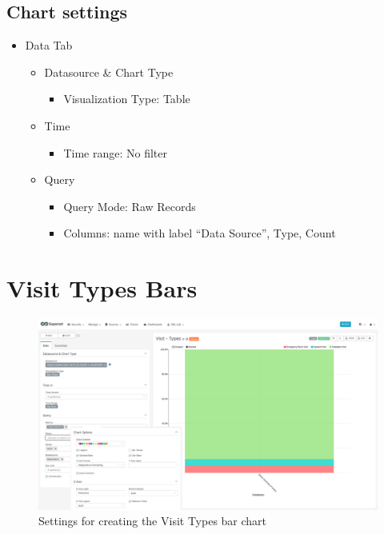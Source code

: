 \documentclass[
]{book}
\providecommand{\tightlist}{%
  \setlength{\itemsep}{0pt}\setlength{\parskip}{0pt}}
\begin{document}
\hypertarget{chart-settings-17}{%
\subsection{Chart settings}\label{chart-settings-17}}

\begin{itemize}
\item
  Data Tab

  \begin{itemize}
  \item
    Datasource \& Chart Type

    \begin{itemize}
    \tightlist
    \item
      Visualization Type: Table
    \end{itemize}
  \item
    Time

    \begin{itemize}
    \tightlist
    \item
      Time range: No filter
    \end{itemize}
  \item
    Query

    \begin{itemize}
    \item
      Query Mode: Raw Records
    \item
      Columns: name with label ``Data Source'', Type, Count
    \end{itemize}
  \end{itemize}
\end{itemize}

\hypertarget{visit-types-bars}{%
\section{Visit Types Bars}\label{visit-types-bars}}

\begin{figure}
\includegraphics[width=1\linewidth]{images/06-visit/03-visit_types_bars} \caption{Settings for creating the Visit Types bar chart}\label{fig:visitTypeBars}
\end{figure}
\end{document}
